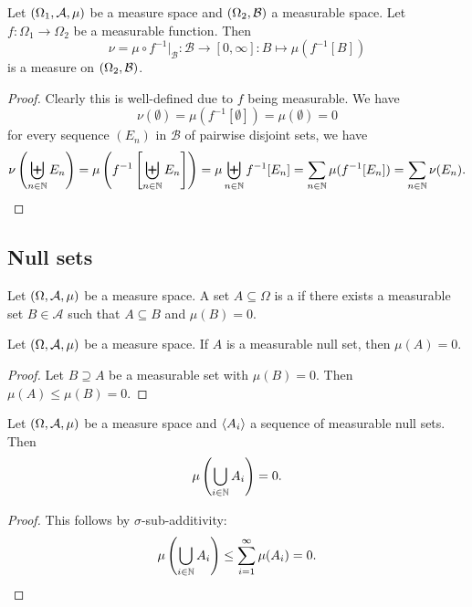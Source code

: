 \begin{proposition} \label{pushforwardMeasure}
Let $\left( \Omega_1, \mathcal{A}, \mu \right)$ be a measure space and $\left( \Omega_2, \mathcal{B} \right)$ a measurable space. Let $f: \Omega_1 \to \Omega_2$ be a measurable function. Then
\[ \nu = \mu\circ f^{-1}|_{\mathcal{B}}: \mathcal{B}\to [0,\infty]: B \mapsto \mu(f^{-1}[B]) \]
is a measure on $\left( \Omega_2, \mathcal{B} \right)$.
\end{proposition}
\begin{proof}
Clearly this is well-defined due to $f$ being measurable. We have
\[ \nu(\emptyset) = \mu(f^{-1}[\emptyset])  = \mu(\emptyset) = 0 \]
for every sequence $(E_n)$ in $\mathcal{B}$ of pairwise disjoint sets, we have
\[ \nu\left(\biguplus_{n\in\mathbb{N}}E_n\right) = \mu\left(f^{-1}\left[\biguplus_{n\in\mathbb{N}}E_n\right]\right) = \mu\biguplus_{n\in\mathbb{N}} f^{-1}[E_n]  = \sum_{n\in\mathbb{N}}\mu(f^{-1}[E_n]) = \sum_{n\in\mathbb{N}}\nu(E_n). \]
\end{proof}

\subsection{Null sets}
\begin{definition}
Let $\left( \Omega, \mathcal{A}, \mu \right)$ be a measure space. A set $A\subseteq \Omega$ is a  if there exists a measurable set $B\in\mathcal{A}$ such that $A\subseteq B$ and $\mu(B) = 0$.
\end{definition}

\begin{lemma} \label{measureNullSet}
Let $\left( \Omega, \mathcal{A}, \mu \right)$ be a measure space. If $A$ is a measurable null set, then $\mu(A) = 0$.
\end{lemma}
\begin{proof}
Let $B\supseteq A$ be a measurable set with $\mu(B) = 0$. Then $\mu(A) \leq \mu(B) = 0$.
\end{proof}

\begin{lemma} \label{countableUnionNullSets}
Let $\left( \Omega, \mathcal{A}, \mu \right)$ be a measure space and $\left\langle A_i \right\rangle$ a sequence of measurable null sets. Then
\[ \mu\left(\bigcup_{i\in\mathbb{N}}A_i\right) = 0. \]
\end{lemma}
\begin{proof}
This follows by $\sigma$-sub-additivity:
\[ \mu\left(\bigcup_{i\in\mathbb{N}}A_i\right) \leq \sum_{i=1}^\infty \mu(A_i) = 0. \]
\end{proof}

